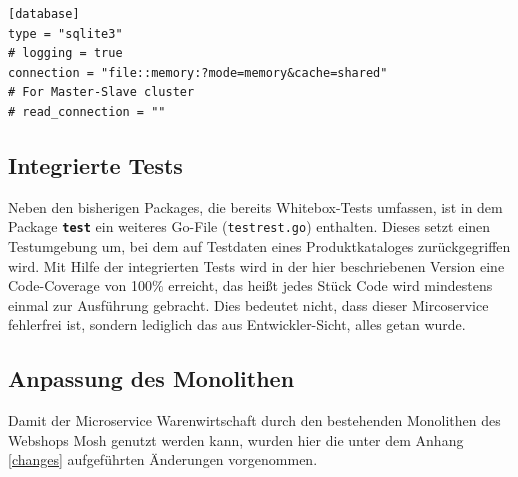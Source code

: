 \begin{lstlisting}[caption=Datenbankeinstellungen in der Konfigurationsdatei]
[database]
type = "sqlite3"
# logging = true
connection = "file::memory:?mode=memory&cache=shared"
# For Master-Slave cluster
# read_connection = ""
\end{lstlisting}

\newpage
\subsection{Integrierte Tests}
\label{subsec: Integrierte Test}
Neben den bisherigen Packages, die bereits Whitebox-Tests umfassen, ist in dem Package \textbf{\texttt{test}} ein weiteres Go-File (\texttt{testrest.go}) enthalten. Dieses setzt einen Testumgebung um, bei dem auf Testdaten eines Produktkataloges zurückgegriffen wird. Mit Hilfe der integrierten Tests wird in der hier beschriebenen Version eine Code-Coverage von 100\% erreicht, das heißt jedes Stück Code wird mindestens einmal zur Ausführung gebracht.
Dies bedeutet nicht, dass dieser Mircoservice fehlerfrei ist, sondern lediglich das aus Entwickler-Sicht, alles getan wurde.

\subsection{Anpassung des Monolithen}
\label{subsec: Anpassung des Monolithen}
Damit der Microservice Warenwirtschaft durch den bestehenden Monolithen des Webshops Mosh genutzt werden kann, wurden hier die unter dem Anhang \ref{changes} aufgeführten Änderungen vorgenommen.
